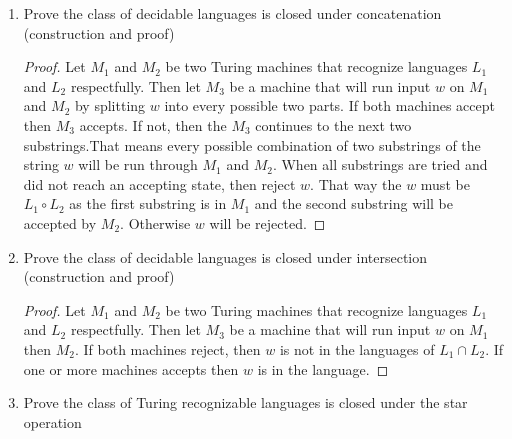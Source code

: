 \documentclass{article}
\begin{document}
\begin{enumerate}
\begin{proof}
            Let $M_1$ and $M_2$ be two Turing machines that recognize languages $L_1$ and $L_2$
            respectfully. Then let $M_3$ be a machine that will run input $w$ alternately between 
            machines $M_1$ and $M_2$. If a machine accepts, $M_3$ accepts. If both 
            machines reject then $M_3$ rejects. As $w\in L_1\cup L_2$, the string can be $w\in L_1$,
            then the $M_1$ portions of $M_3$ will accept it. If the string is $w\in L_2$, then the
            $M_2$ portions of $M_3$ will accept it. If the string is $w\not\in L_1\cup L_2$ then 
            $w\not\in L_1$ and $w\not\in L_2$ and so $M_3$ will not accept $w$. Therefore $M_3$ 
            recognizes $L_1\cup L_2$.
        \end{proof}
        \item Prove the class of decidable languages is closed under concatenation (construction 
        and proof)
        \begin{proof}
            Let $M_1$ and $M_2$ be two Turing machines that recognize languages $L_1$ and $L_2$
            respectfully. Then let $M_3$ be a machine that will run input $w$ on $M_1$ and $M_2$
            by splitting $w$ into every possible two parts. If both machines accept then $M_3$ 
            accepts. If not, then the $M_3$ continues to the next two substrings.That means every 
            possible combination of two substrings of the string $w$ will be run through $M_1$ 
            and $M_2$. When all substrings are tried and did not reach an accepting state, then 
            reject $w$. That way the $w$ must be $L_1\circ L_2$ as the first substring is in 
            $M_1$ and the second substring will be accepted by $M_2$. Otherwise $w$ will be rejected.
        \end{proof}
        \item Prove the class of decidable languages is closed under intersection (construction 
        and proof)
        \begin{proof}
            Let $M_1$ and $M_2$ be two Turing machines that recognize languages $L_1$ and $L_2$
            respectfully. Then let $M_3$ be a machine that will run input $w$ on $M_1$ then $M_2$.
            If both machines reject, then $w$ is not in the languages of $L_1\cap L_2$. If one or
            more machines accepts then $w$ is in the language.
        \end{proof}
        \item Prove the class of Turing recognizable languages is closed under the star operation 

\end{enumerate}
\end{document}
